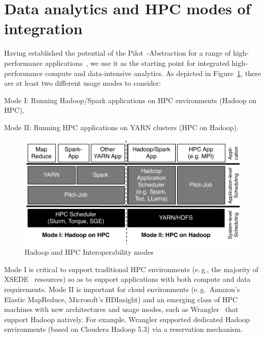\section{Data analytics and HPC modes of integration}
\label{sec:integration_mode}
Having established the potential of the Pilot~-Abstraction for a range of high-performance applications~\cite{treikalis2016repex,ragothaman2014developing,ko2014numerical}, we use it as the starting point for integrated high-performance compute and data-intensive analytics.
As depicted in Figure~\ref{fig:figures_hadoop-on-hpc-viceverse}, there are at least two different usage modes to consider:
\begin{inparaenum}[(i)]
    \item Mode I: Running Hadoop/Spark applications on HPC environments (Hadoop on HPC),
    \item Mode II: Running HPC applications on YARN clusters (HPC on Hadoop).
\end{inparaenum}

\begin{figure}[t]
    \centering
    \includegraphics[width=.95\textwidth]{figures/data_analytics_hpc/hpc_hadoop/hadoop-on-hpc-viceverse.pdf}
    \caption{Hadoop and HPC Interoperability modes\label{fig:figures_hadoop-on-hpc-viceverse}}
\end{figure}

Mode I is critical to support traditional HPC environments (e.\,g., the majority of XSEDE~\cite{xsede} resources) so as to support applications with both compute and data requirements.
Mode II is important for cloud environments (e.\,g.\ Amazon's Elastic MapReduce, Microsoft's HDInsight) and an emerging class of HPC machines with new architectures and usage modes, such as Wrangler~\cite{wrangler} that support Hadoop natively.
For example, Wrangler supported dedicated Hadoop environments (based on Cloudera Hadoop 5.3) via a reservation mechanism.

